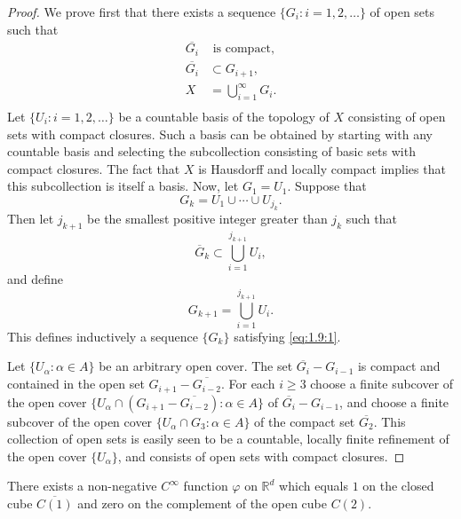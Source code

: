 \begin{proof}
	We prove first that there exists a sequence  $ \{G_{i}: i = 1, 2, \ldots\} $ of open sets such that
	\begin{equation}
		\label{eq:1.9:1}
		\begin{aligned}{\overline{{G_{i}}}} & {{}\text{ is compact,}} \\
		               {\overline{{G_{i}}}} & {{}\subset G_{i+1},}    \\ {X}&{{}=\bigcup_{i=1}^{\infty}G_{i}.}\\\end{aligned}
	\end{equation}
	Let $\{U_{i}: i=1,2,\ldots\}$ be a countable basis of the topology of $X$
	consisting of open sets with compact closures. Such a basis can be
	obtained by starting with any countable basis and selecting the
	subcollection consisting of basic sets with compact closures.
	The fact that $X$ is Hausdorff and locally compact implies that this
	subcollection is itself a basis. Now, let $G_{1}=U_{1}$. Suppose that
	\[
		G_{k}=U_{1}\cup\cdots\cup U_{j_{k}}.
	\]
	Then let  $ j_{k+1} $ be the smallest positive integer greater than  $ j_{k} $ such that
	\[
		\overline{{G}}_{k}\subset\bigcup_{i=1}^{j_{k+1}}U_{i},
	\]
	and define
	\[
		G_{k+1}=\bigcup_{i=1}^{j_{k+1}}U_{i}.
	\]
	This defines inductively a sequence  $ \{G_{k}\} $ satisfying \eqref{eq:1.9:1}.
	\begin{center}\end{center}
	Let $\{U_\alpha : \alpha \in A\}$ be an arbitrary open cover. The set $\overline{G_i} - G_{i-1}$
	is compact and contained in the open set $G_{i+1} - \overline{G_{i-2}}$.
	For each $i \geq 3$ choose a finite subcover of the open cover
	$\{U_\alpha \cap (G_{i+1} - \overline{G_{i-2}}): \alpha \in A\}$ of
	$\overline{G_i} - G_{i-1}$, and choose a finite subcover of the open
	cover $\{U_\alpha \cap G_3 : \alpha \in A\}$ of the compact set $\overline{G_2}$.
	This collection of open sets is easily seen to be a countable,
	locally finite refinement of the open cover $\{U_\alpha\}$, and consists of open sets with compact closures.
\end{proof}

\begin{lemma}\label{thm:1.10}
	There exists a non-negative $C^{\infty}$ function $\varphi$ on
	$\mathbb{R}^{d}$ which equals $1$ on the closed cube $\overline{C(1)}$
	and zero on the complement of the open cube $C(2)$.
\end{lemma}

